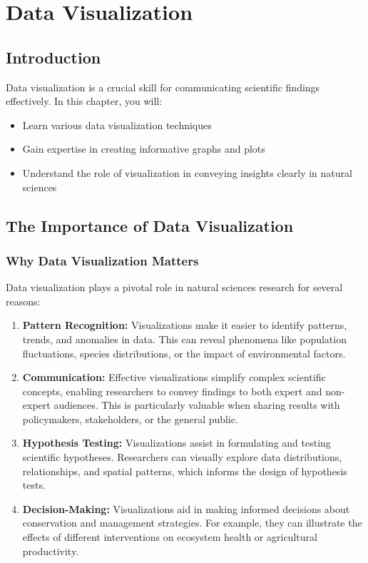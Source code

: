 \documentclass[
  letterpaper,
]{book}
\providecommand{\tightlist}{%
  \setlength{\itemsep}{0pt}\setlength{\parskip}{0pt}}
\begin{document}
\chapter{Data Visualization}\label{data-visualization-1}

\section{Introduction}\label{introduction-4}

Data visualization is a crucial skill for communicating scientific
findings effectively. In this chapter, you will:

\begin{itemize}
\tightlist
\item
  Learn various data visualization techniques
\item
  Gain expertise in creating informative graphs and plots
\item
  Understand the role of visualization in conveying insights clearly in
  natural sciences
\end{itemize}

\section{The Importance of Data
Visualization}\label{the-importance-of-data-visualization}

\subsection{Why Data Visualization
Matters}\label{why-data-visualization-matters}

Data visualization plays a pivotal role in natural sciences research for
several reasons:

\begin{enumerate}
\def\labelenumi{\arabic{enumi}.}
\item
  \textbf{Pattern Recognition:} Visualizations make it easier to
  identify patterns, trends, and anomalies in data. This can reveal
  phenomena like population fluctuations, species distributions, or the
  impact of environmental factors.
\item
  \textbf{Communication:} Effective visualizations simplify complex
  scientific concepts, enabling researchers to convey findings to both
  expert and non-expert audiences. This is particularly valuable when
  sharing results with policymakers, stakeholders, or the general
  public.
\item
  \textbf{Hypothesis Testing:} Visualizations assist in formulating and
  testing scientific hypotheses. Researchers can visually explore data
  distributions, relationships, and spatial patterns, which informs the
  design of hypothesis tests.
\item
  \textbf{Decision-Making:} Visualizations aid in making informed
  decisions about conservation and management strategies. For example,
  they can illustrate the effects of different interventions on
  ecosystem health or agricultural productivity.
\end{enumerate}
\end{document}
